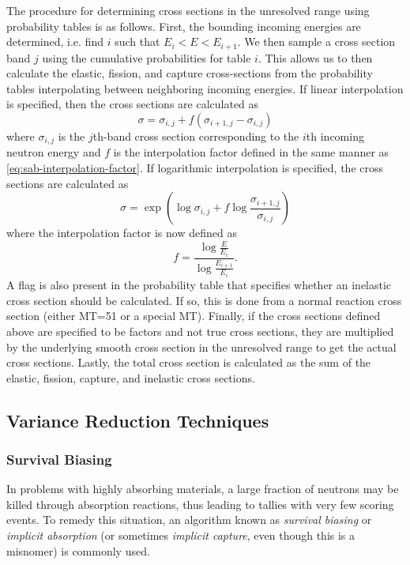 The procedure for determining cross sections in the unresolved range using
probability tables is as follows. First, the bounding incoming energies are
determined, i.e. find $i$ such that $E_i < E < E_{i+1}$. We then sample a cross
section band $j$ using the cumulative probabilities for table $i$. This allows
us to then calculate the elastic, fission, and capture cross-sections from the
probability tables interpolating between neighboring incoming energies. If
linear interpolation is specified, then the cross sections are calculated as
\begin{equation}
  \label{eq:ptables-linlin}
  \sigma = \sigma_{i,j} + f (\sigma_{i+1,j} - \sigma_{i,j})
\end{equation}
where $\sigma_{i,j}$ is the $j$th-band cross section corresponding to the $i$th
incoming neutron energy and $f$ is the interpolation factor defined in the same
manner as \eqref{eq:sab-interpolation-factor}. If logarithmic interpolation is
specified, the cross sections are calculated as
\begin{equation}
  \label{eq:ptables-loglog}
  \sigma = \exp \left ( \log \sigma_{i,j} + f \log
  \frac{\sigma_{i+1,j}}{\sigma_{i,j}} \right )
\end{equation}
where the interpolation factor is now defined as
\begin{equation}
  \label{eq:log-interpolation-factor}
  f = \frac{\log \frac{E}{E_i}}{\log \frac{E_{i+1}}{E_i}}.
\end{equation}
A flag is also present in the probability table that specifies whether an
inelastic cross section should be calculated. If so, this is done from a normal
reaction cross section (either MT=51 or a special MT). Finally, if the cross
sections defined above are specified to be factors and not true cross sections,
they are multiplied by the underlying smooth cross section in the unresolved
range to get the actual cross sections. Lastly, the total cross section is
calculated as the sum of the elastic, fission, capture, and inelastic cross
sections.

\subsection{Variance Reduction Techniques}

\subsubsection{Survival Biasing}

In problems with highly absorbing materials, a large fraction of neutrons may be
killed through absorption reactions, thus leading to tallies with very few
scoring events. To remedy this situation, an algorithm known as \emph{survival
  biasing} or \emph{implicit absorption} (or sometimes \emph{implicit capture},
even though this is a misnomer) is commonly used.

